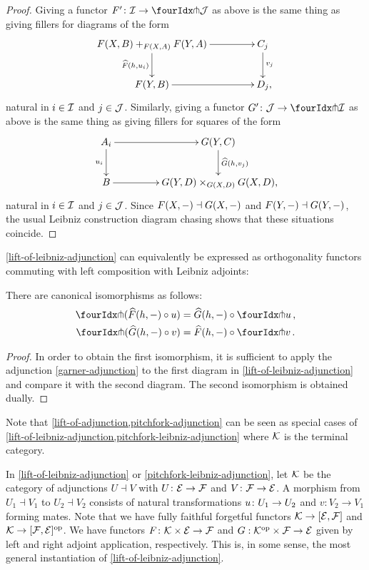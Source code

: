 \documentclass[reqno,10pt,a4paper,oneside,draft]{amsart}
\begin{document}
\begin{proof}
Giving a functor $F' \co \cal{I} \to \liftl{\cal{J}}$ as above is the same thing as giving fillers for diagrams of the form
\[
\xymatrix@C+2em{
  F(X,B) +_{F(X,A)} F(Y,A)
  \ar[d]_{\widehat{F}(h, u_i)}
  \ar[r]
&
  C_j
  \ar[d]^{v_j}
\\
  F(Y, B)
  \ar[r]
&
  D_j \rlap{,}
}
\]
natural in $i \in \cal{I}$ and $j \in \cal{J}$.
Similarly, giving a functor $G' \co \cal{J} \to \liftl{\cal{I}}$ as above is the same thing as giving fillers for squares of the form
\[
\xymatrix@C+2em{
  A_i
  \ar[d]_{u_i}
  \ar[r]
&
  G(Y, C)
  \ar[d]^{\widehat{G}(h, v_j)}
\\
  B
  \ar[r]
&
  G(Y,D) \times_{G(X,D)} G(X,D) \rlap{,}
}
\]
natural in $i \in \cal{I}$ and $j \in \cal{J}$.
Since $F(X, \arghole) \dashv G(X, \arghole)$ and $F(Y, \arghole) \dashv G(Y, \arghole)$, the usual Leibniz construction diagram chasing shows that these situations coincide.
\end{proof}

\cref{lift-of-leibniz-adjunction} can equivalently be expressed as orthogonality functors commuting with left composition with Leibniz adjoints:

\begin{corollary} \label{pitchfork-leibniz-adjunction} There are canonical isomorphisms as follows:
\begin{align*}
  \liftr{(\widehat{F}(h, -) \cc u)} &= \widehat{G}(h, -) \cc \liftr{u}
\, ,\\
  \liftl{(\widehat{G}(h, -) \cc v)} &= \widehat{F}(h, -) \cc \liftl{v}
\, .
\end{align*}
\end{corollary}

\begin{proof}
In order to obtain the first isomorphism, it is sufficient to apply the adjunction \eqref{garner-adjunction} to the first diagram in \cref{lift-of-leibniz-adjunction} and compare it with the second diagram.
The second isomorphism is obtained dually.
\end{proof}

Note that \cref{lift-of-adjunction,pitchfork-adjunction} can be seen as special cases of \cref{lift-of-leibniz-adjunction,pitchfork-leibniz-adjunction} where $\cal{K}$ is the terminal category.

\begin{remark} \label{pitchfork-leibniz-most-general-example}
In \cref{lift-of-leibniz-adjunction} or \cref{pitchfork-leibniz-adjunction}, let $\cal{K}$ be the category of adjunctions $U \dashv V$ with $U
\co \cal{E} \to \cal{F}$ and $V \co \cal{F} \to \cal{E}$.
A morphism from $U_1 \dashv V_1$ to $U_2 \dashv V_2$ consists of natural transformations $u \co U_1 \to U_2$ and $v : V_2 \to V_1$ forming mates.
Note that we have fully faithful forgetful functors $\cal{K} \to [\cal{E}, \cal{F}]$ and $\cal{K} \to [\cal{F}, \cal{E}]^{\op}$.
We have functors $F \co \cal{K} \times \cal{E} \to \cal{F}$ and $G : \cal{K}^{\op} \times \cal{F} \to \cal{E}$ given by left and right adjoint application, respectively.
This is, in some sense, the most general instantiation of \cref{lift-of-leibniz-adjunction}.
\end{remark}
\end{document}
